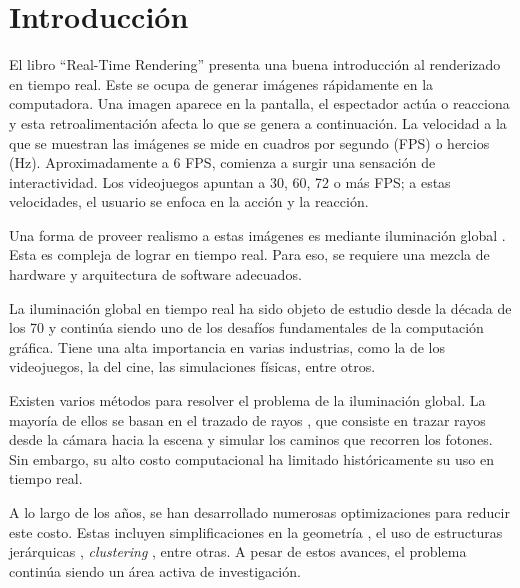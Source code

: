 \chapter{Introducción}


El libro ``Real-Time Rendering'' \cite[p.~1]{rtr} presenta una buena introducción al renderizado en tiempo real.
Este se ocupa de generar imágenes rápidamente en la computadora.
Una imagen aparece en la pantalla, el espectador actúa o reacciona y esta retroalimentación afecta lo que se genera a continuación.
La velocidad a la que se muestran las imágenes se mide en cuadros por segundo (FPS) o hercios (Hz).
Aproximadamente a 6 FPS, comienza a surgir una sensación de interactividad.
Los videojuegos apuntan a 30, 60, 72 o más FPS; a estas velocidades, el usuario se enfoca en la acción y la reacción.

Una forma de proveer realismo a estas imágenes es mediante iluminación global \cite[p.~437]{rtr}.
Esta es compleja de lograr en tiempo real.
Para eso, se requiere una mezcla de hardware y arquitectura de software adecuados.

La iluminación global en tiempo real ha sido objeto de estudio desde la década de los 70 y continúa siendo uno de los desafíos fundamentales de la computación gráfica.
Tiene una alta importancia en varias industrias, como la de los videojuegos, la del cine, las simulaciones físicas, entre otros.

Existen varios métodos para resolver el problema de la iluminación global.
La mayoría de ellos se basan en el trazado de rayos \cite{whitted-1980}, que consiste en trazar rayos desde la cámara hacia la escena y simular los caminos que recorren los fotones.
Sin embargo, su alto costo computacional ha limitado históricamente su uso en tiempo real.

A lo largo de los años, se han desarrollado numerosas optimizaciones para reducir este costo.
Estas incluyen simplificaciones en la geometría \cite{gigavoxels}, el uso de estructuras jerárquicas \cite{real-time-photon-mapping}, \textit{clustering} \cite{faster-photon-mapping}, entre otras.
A pesar de estos avances, el problema continúa siendo un área activa de investigación.

